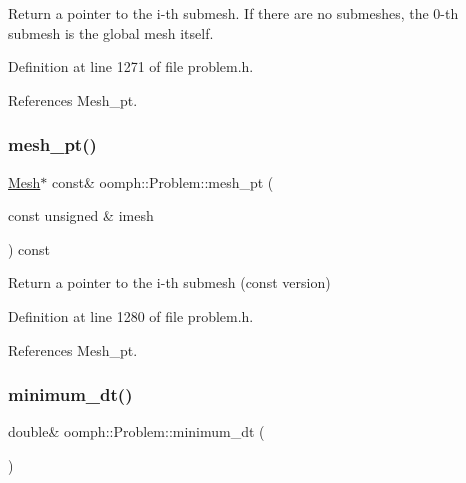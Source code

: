 Return a pointer to the i-\/th submesh. If there are no submeshes, the 0-\/th submesh is the global mesh itself. 



Definition at line 1271 of file problem.\+h.



References Mesh\+\_\+pt.

\mbox{\label{classoomph_1_1Problem_a35b503d711781552b6b56deb612816c4}} 
\subsubsection{\texorpdfstring{mesh\+\_\+pt()}{mesh\_pt()}\hspace{0.1cm}{\footnotesize\ttfamily [4/4]}}
{\footnotesize\ttfamily \hyperlink{classoomph_1_1Mesh}{Mesh}$\ast$ const\& oomph\+::\+Problem\+::mesh\+\_\+pt (\begin{DoxyParamCaption}\item[{const unsigned \&}]{imesh }\end{DoxyParamCaption}) const\hspace{0.3cm}{\ttfamily [inline]}}



Return a pointer to the i-\/th submesh (const version) 



Definition at line 1280 of file problem.\+h.



References Mesh\+\_\+pt.

\mbox{\label{classoomph_1_1Problem_adffc8921bf61edac68ed017bcdc1d792}} 
\subsubsection{\texorpdfstring{minimum\+\_\+dt()}{minimum\_dt()}}
{\footnotesize\ttfamily double\& oomph\+::\+Problem\+::minimum\+\_\+dt (\begin{DoxyParamCaption}{ }\end{DoxyParamCaption})\hspace{0.3cm}{\ttfamily [inline]}}



